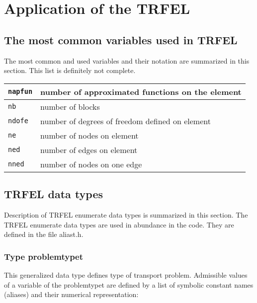 \chapter{Application of the TRFEL}

\section{The most common variables used in TRFEL}

The most common and used variables and their notation are summarized in this section.
This list is definitely not complete.

\begin{center}
\begin{tabular}{|l|l|}
\hline
{\tt napfun} & number of approximated functions on the element
\\ \hline
{\tt nb} & number of blocks
\\ \hline
{\tt ndofe} & number of degrees of freedom defined on element
\\ \hline
{\tt ne} & number of nodes on element
\\ \hline
{\tt ned} & number of edges on element
\\ \hline
{\tt nned} & number of nodes on one edge
\\ \hline
\end{tabular}
\end{center}

\section{TRFEL data types}

Description of TRFEL enumerate data types is summarized in this section. 
The TRFEL enumerate data types are used in abundance in the code. They are defined
in the file aliast.h.

\subsection{Type {\sf problemtypet}}
\label{sectproblemtypet}

This generalized data type defines type of transport problem.
Admissible values of a variable of the {\sf problemtypet} are defined by a list of symbolic constant names (aliases)
and their numerical representation:

